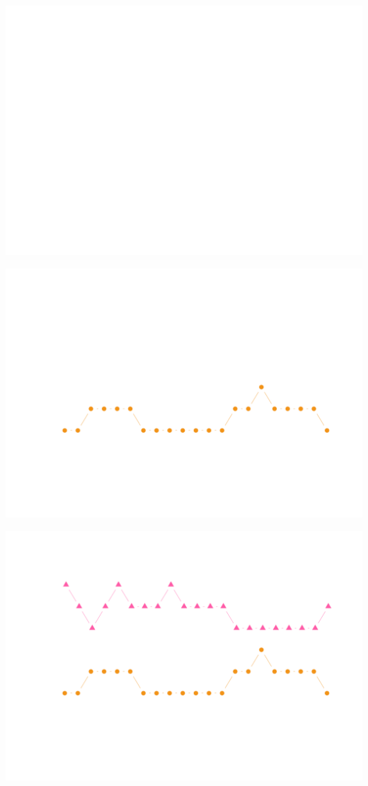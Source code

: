 \documentclass{article}\usepackage[]{graphicx}\usepackage[]{color}
\newenvironment{knitrout}{}{} %
\begin{document}
\begin{knitrout}
\color{fgcolor}
\includegraphics[width=\textwidth]{figure/dice2-1} 

\includegraphics[width=\textwidth]{figure/dice2-2} 

\includegraphics[width=\textwidth]{figure/dice2-3} 


\end{knitrout}
\end{document}
